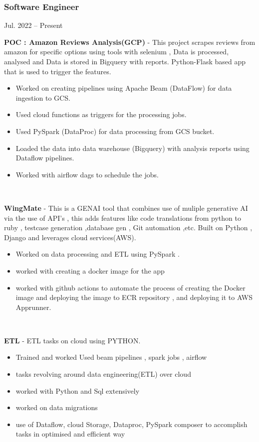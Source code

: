 \documentclass{resume}
\begin{document}
\begin{adjustwidth}{0.75cm}{0pt} %
\subsubsection*{\textbf{Software Engineer}}{Jul. 2022 -- Present}
  \item \textbf{POC : Amazon Reviews Analysis(GCP)} - 
     This project scrapes reviews from amazon for specific options using tools with selenium , Data is processed, analysed and Data is stored in Bigquery with reports. Python-Flask based app that is used to trigger the features.
\begin{itemize}
  \item Worked on creating pipelines using Apache Beam (DataFlow) for data ingestion to GCS.
  \item Used cloud functions as triggers for the processing jobs.
  \item Used PySpark (DataProc) for data processing from GCS bucket.
  \item Loaded the data into data warehouse (Bigquery) with analysis reports using Dataflow pipelines.
  \item Worked with airflow dags to schedule the jobs.

\\
\end{itemize}
 \item \textbf{WingMate} - 
     This is a GENAI tool that combines use of muliple generative AI via the use of API's , this adds features like code translations from python to ruby , testcase generation ,database gen , Git automation ,etc. Built on Python , Django and leverages cloud services(AWS).
\begin{itemize}
  \item Worked on data processing and ETL using PySpark .
  \item worked with creating a docker image for the app
  \item worked with github actions to automate the process of creating the Docker image and deploying the image to ECR repository , and deploying it to AWS Apprunner.
\end{itemize}
\\
 \item \textbf{ETL} - 
     ETL tasks on cloud using PYTHON.
\begin{itemize}
  \item Trained and worked Used beam pipelines , spark jobs  , airflow
  \item tasks revolving around data engineering(ETL) over cloud
  \item worked with Python and Sql extensively
  \item worked on data migrations 
  \item use of Dataflow, cloud Storage, Dataproc, PySpark composer to accomplish tasks in optimised and efficient way


\end{itemize}
\end{adjustwidth}
\end{document}
